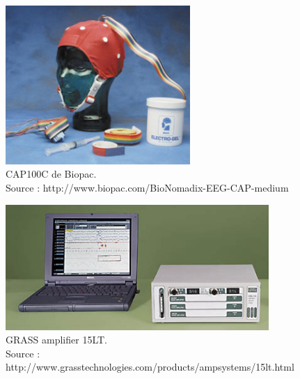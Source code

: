 \smallbreak

\begin{figure}[h]
	\centering\includegraphics[width=7cm]{images/cap100.jpg}
	\caption[CAP100C de Biopac]{CAP100C de Biopac.\\Source : http://www.biopac.com/BioNomadix-EEG-CAP-medium}
	\label{fig:CAP100C}
\end{figure}

\begin{figure}[h]
	\centering\includegraphics[width=10cm]{images/GRASS.jpg}
	\caption[GRASS amplifier 15LT]{GRASS amplifier 15LT.\\Source : http://www.grasstechnologies.com/products/ampsystems/15lt.html}
	\label{Grass}
\end{figure}

